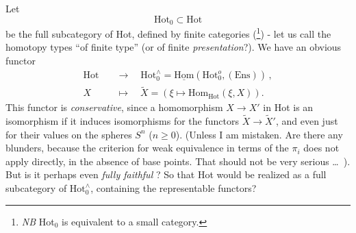 \documentclass[11pt]{article}
\newcommand{\printedpage}[1]{\marginpar{\footnotesize p.~#1}}
\newcommand{\msp}[1]{\marginpar{\footnotesize [#1]}}
\newcommand{\uHom}{\underline{\mathrm{Hom}}}
\newcommand{\Hom}{\mathrm{Hom}}
\newcommand{\Hot}{\mathrm{Hot}}
\newcommand{\Ens}{\mathrm{Ens}}
\begin{document}
Let
\[
\Hot_0 \subset \Hot
\]
\printedpage{32}
be the full subcategory of Hot, defined by finite categories (\footnote[9]{\textit{NB} Hot$_0$ is equivalent to a small category.}) - let us call the homotopy types ``of finite type'' (or of finite \textit{presentation}?). We have an obvious functor
\msp{page 52}
\[
\begin{aligned}
\Hot \quad &\longrightarrow \quad \Hot_0^{\wedge} = \uHom(\Hot_0^{o}, (\Ens)) \, ,\\
X \quad &\longmapsto \quad \tilde{X} = (\xi \longmapsto \Hom_{\Hot}(\xi, X)).
\end{aligned}
\]
This functor is \textit{conservative}, since a homomorphism $X \longrightarrow X'$ in Hot is an isomorphism if it induces isomorphisms for the functors $\tilde{X} \longrightarrow \tilde{X}'$, and even just for their values on the spheres $S^n$ ($n \geq 0$). (Unless I am mistaken. Are there any blunders, because the criterion for weak equivalence in terms of the $\pi_i$ does not apply directly, in the absence of base points. That should not be very serious \ldots\ ). But is it perhaps even \textit{fully faithful} ? So that Hot would be realized as a full subcategory of $\Hot_0^{\wedge}$, containing the representable functors?
\end{document}
